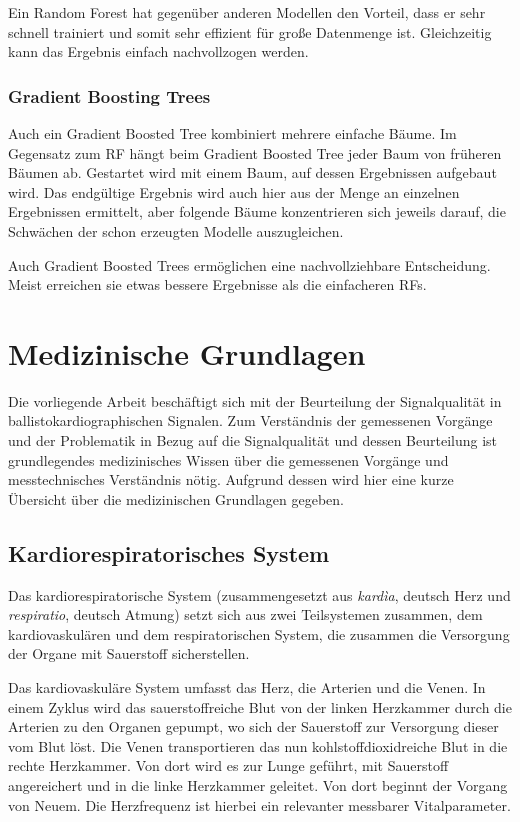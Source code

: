 		Ein Random Forest hat gegenüber anderen Modellen den Vorteil, dass er sehr schnell trainiert und somit sehr effizient für große Datenmenge ist. Gleichzeitig kann das Ergebnis einfach nachvollzogen werden.
		
		\subsubsection{Gradient Boosting Trees}
		
		Auch ein Gradient Boosted Tree kombiniert mehrere einfache Bäume. Im Gegensatz zum \ac{RF} hängt beim Gradient Boosted Tree jeder Baum von früheren Bäumen ab. Gestartet wird mit einem Baum, auf dessen Ergebnissen aufgebaut wird. Das endgültige Ergebnis wird auch hier aus der Menge an einzelnen Ergebnissen ermittelt, aber folgende Bäume konzentrieren sich jeweils darauf, die Schwächen der schon erzeugten Modelle auszugleichen.
		
		Auch Gradient Boosted Trees ermöglichen eine nachvollziehbare Entscheidung. Meist erreichen sie etwas bessere Ergebnisse als die einfacheren \acl{RF}s.

\section{Medizinische Grundlagen}\label{med-grundlagen}

Die vorliegende Arbeit beschäftigt sich mit der Beurteilung der Signalqualität in ballistokardiographischen Signalen. Zum Verständnis der gemessenen Vorgänge und der Problematik in Bezug auf die Signalqualität und dessen Beurteilung ist grundlegendes medizinisches Wissen über die gemessenen Vorgänge und messtechnisches Verständnis nötig. Aufgrund dessen wird hier eine kurze Übersicht über die medizinischen Grundlagen gegeben.

	\subsection{Kardiorespiratorisches System}
	
	Das kardiorespiratorische System (zusammengesetzt aus \textit{kardìa}, deutsch \glq Herz\grq{} und \textit{respiratio}, deutsch \glq Atmung\grq) setzt sich aus zwei Teilsystemen zusammen, dem kardiovaskulären und dem respiratorischen System, die zusammen die Versorgung der Organe mit Sauerstoff sicherstellen.
	
	Das kardiovaskuläre System umfasst das Herz, die Arterien und die Venen. In einem Zyklus wird das sauerstoffreiche Blut von der linken Herzkammer durch die Arterien zu den Organen gepumpt, wo sich der Sauerstoff zur Versorgung dieser vom Blut löst. Die Venen transportieren das nun kohlstoffdioxidreiche Blut in die rechte Herzkammer. Von dort wird es zur Lunge geführt, mit Sauerstoff angereichert und in die linke Herzkammer geleitet. Von dort beginnt der Vorgang von Neuem. Die Herzfrequenz ist hierbei ein relevanter messbarer Vitalparameter.
	
